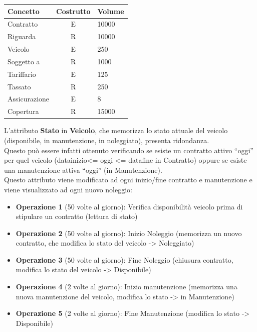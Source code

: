 \documentclass[10pt,a4paper]{article}
\begin{document}
\begin{table}[H]
\centering
\begin{tabular}{|l|c|l|}
\hline
\textbf{Concetto} & \textbf{Costrutto} & \textbf{Volume}\\
\hline
Contratto & E & 10000 \\
\hline
Riguarda & R & 10000\\
\hline
Veicolo & E & 250\\
\hline
Soggetto a & R & 1000\\
\hline
Tariffario & E & 125\\
\hline
Tassato & R & 250\\
\hline
Assicurazione & E & 8\\
\hline
Copertura & R & 15000\\
\hline
\end{tabular}
\end{table}


\noindent
L’attributo \textbf{Stato} in \textbf{Veicolo}, che memorizza lo stato attuale del veicolo (disponibile, in manutenzione, in noleggiato), presenta ridondanza.\\
Questo può essere infatti ottenuto verificando se esiste un contratto attivo “oggi” per quel veicolo (datainizio<= oggi <= datafine in Contratto) oppure se esiste una manutenzione attiva “oggi” (in Manutenzione).\\
Questo attributo viene modificato ad ogni inizio/fine contratto e manutenzione e viene visualizzato ad ogni nuovo noleggio:

\begin{itemize}
\item \textbf{Operazione 1} (50 volte al giorno): Verifica disponibilità veicolo prima di stipulare un contratto (lettura di stato)
\item \textbf{Operazione 2} (50 volte al giorno): Inizio Noleggio (memorizza un nuovo contratto, che modifica lo stato del veicolo -> Noleggiato)
\item \textbf{Operazione 3} (50 volte al giorno): Fine Noleggio (chiusura contratto, modifica lo stato del veicolo -> Disponibile)
\item \textbf{Operazione 4} (2 volte al giorno): Inizio manutenzione (memorizza una nuova manutenzione del veicolo, modifica lo stato -> in Manutenzione)
\item \textbf{Operazione 5} (2 volte al giorno): Fine Manutenzione (modifica lo stato -> Disponibile)
\end{itemize}
\end{document}
